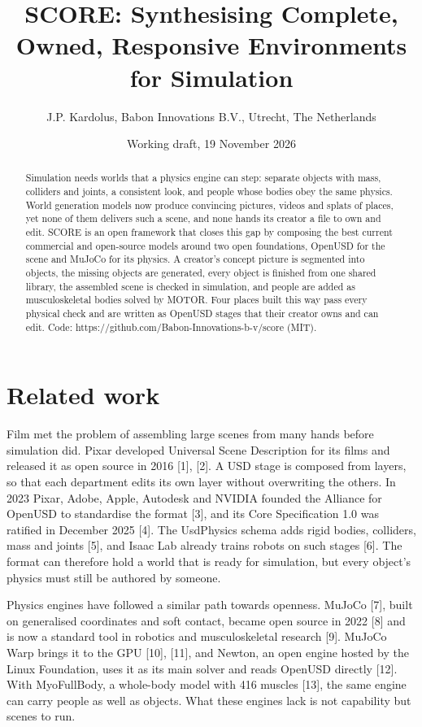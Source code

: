 \documentclass[
  11pt,
]{article}
\title{SCORE: Synthesising Complete, Owned, Responsive Environments for
Simulation}
\author{J.P. Kardolus, Babon Innovations B.V., Utrecht, The Netherlands}
\date{Working draft, 19 November 2026}
\makeatletter
\def\fps@figure{htbp}
\makeatother
\begin{document}
\maketitle
\begin{abstract}
Simulation needs worlds that a physics engine can step: separate objects
with mass, colliders and joints, a consistent look, and people whose
bodies obey the same physics. World generation models now produce
convincing pictures, videos and splats of places, yet none of them
delivers such a scene, and none hands its creator a file to own and
edit. SCORE is an open framework that closes this gap by composing the
best current commercial and open-source models around two open
foundations, OpenUSD for the scene and MuJoCo for its physics. A
creator's concept picture is segmented into objects, the missing objects
are generated, every object is finished from one shared library, the
assembled scene is checked in simulation, and people are added as
musculoskeletal bodies solved by MOTOR. Four places built this way pass
every physical check and are written as OpenUSD stages that their
creator owns and can edit. Code:
https://github.com/Babon-Innovations-b-v/score (MIT).
\end{abstract}

\makeatletter\def\fps@figure{tp}\makeatother\renewcommand{\topfraction}{0.9}\renewcommand{\textfraction}{0.1}

\section{Related work}\label{related-work}

Film met the problem of assembling large scenes from many hands before
simulation did. Pixar developed Universal Scene Description for its
films and released it as open source in 2016 {[}1{]}, {[}2{]}. A USD
stage is composed from layers, so that each department edits its own
layer without overwriting the others. In 2023 Pixar, Adobe, Apple,
Autodesk and NVIDIA founded the Alliance for OpenUSD to standardise the
format {[}3{]}, and its Core Specification 1.0 was ratified in December
2025 {[}4{]}. The UsdPhysics schema adds rigid bodies, colliders, mass
and joints {[}5{]}, and Isaac Lab already trains robots on such stages
{[}6{]}. The format can therefore hold a world that is ready for
simulation, but every object's physics must still be authored by
someone.

Physics engines have followed a similar path towards openness. MuJoCo
{[}7{]}, built on generalised coordinates and soft contact, became open
source in 2022 {[}8{]} and is now a standard tool in robotics and
musculoskeletal research {[}9{]}. MuJoCo Warp brings it to the GPU
{[}10{]}, {[}11{]}, and Newton, an open engine hosted by the Linux
Foundation, uses it as its main solver and reads OpenUSD directly
{[}12{]}. With MyoFullBody, a whole-body model with 416 muscles
{[}13{]}, the same engine can carry people as well as objects. What
these engines lack is not capability but scenes to run.
\end{document}
